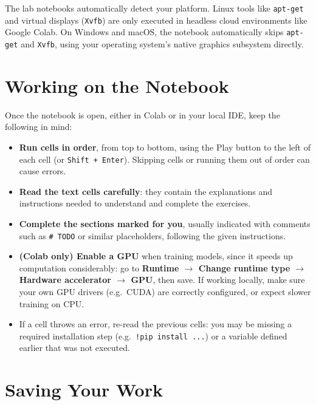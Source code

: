 \documentclass[11pt,a4paper]{article}
\begin{document}
\begin{infobox}
The lab notebooks automatically detect your platform. Linux tools like \texttt{apt-get} and virtual displays (\texttt{Xvfb}) are only executed in headless cloud environments like Google Colab. On Windows and macOS, the notebook automatically skips \texttt{apt-get} and \texttt{Xvfb}, using your operating system's native graphics subsystem directly.
\end{infobox}

\section{Working on the Notebook}

Once the notebook is open, either in Colab or in your local IDE, keep the following in mind:

\begin{itemize}
    \item \textbf{Run cells in order}, from top to bottom, using the Play button to the left of each cell (or \texttt{Shift + Enter}). Skipping cells or running them out of order can cause errors.
    \item \textbf{Read the text cells carefully}: they contain the explanations and instructions needed to understand and complete the exercises.
    \item \textbf{Complete the sections marked for you}, usually indicated with comments such as \texttt{\# TODO} or similar placeholders, following the given instructions.
    \item \textbf{(Colab only) Enable a GPU} when training models, since it speeds up computation considerably: go to \textbf{Runtime $\rightarrow$ Change runtime type $\rightarrow$ Hardware accelerator $\rightarrow$ GPU}, then save. If working locally, make sure your own GPU drivers (e.g.\ CUDA) are correctly configured, or expect slower training on CPU.
    \item If a cell throws an error, re-read the previous cells: you may be missing a required installation step (e.g.\ \texttt{!pip install ...}) or a variable defined earlier that was not executed.
\end{itemize}

\section{Saving Your Work}
\label{sec:saving}
\end{document}

